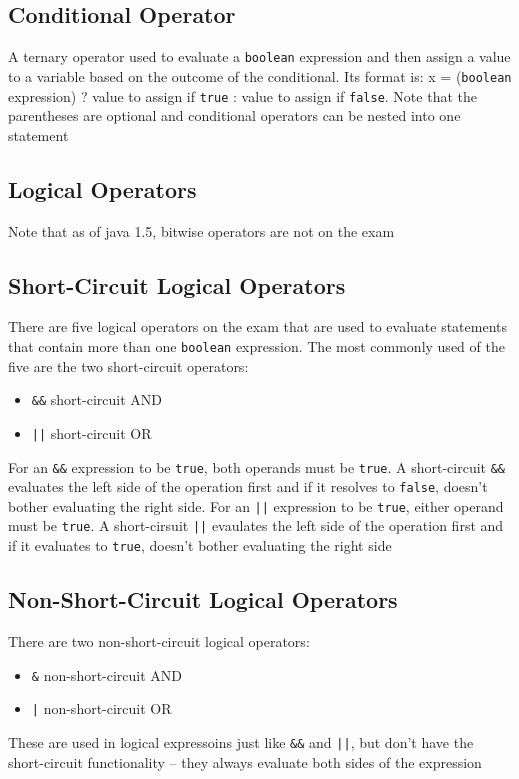 \subsection{Conditional Operator}
A ternary operator used to evaluate a \verb#boolean# expression and then assign 
a value to a variable based on the outcome of the conditional. Its format is: x 
= (\verb#boolean# expression) ? value to assign if \verb#true# : value to 
assign if \verb#false#. Note that the parentheses are optional and conditional 
operators can be nested into one statement

\subsection{Logical Operators}
Note that as of java 1.5, bitwise operators are not on the exam

\subsection{Short-Circuit Logical Operators}
There are five logical operators on the exam that are used to evaluate 
statements that contain more than one \verb#boolean# expression. The most 
commonly used of the five are the two short-circuit operators:
\begin{itemize}
    \item \verb#&&# short-circuit AND
    \item \verb#||# short-circuit OR
\end{itemize}
For an \verb#&&# expression to be \verb#true#, both operands must be 
\verb#true#. A short-circuit \verb#&&# evaluates the left side of the operation 
first and if it resolves to \verb#false#, doesn't bother evaluating the right 
side. For an \verb#||# expression to be \verb#true#, either operand must be 
\verb#true#. A short-cirsuit \verb#||# evaulates the left side of the operation 
first and if it evaluates to \verb#true#, doesn't bother evaluating the right 
side

\subsection{Non-Short-Circuit Logical Operators}
There are two non-short-circuit logical operators:
\begin{itemize}
    \item \verb#&# non-short-circuit AND
    \item \verb#|# non-short-circuit OR
\end{itemize}
These are used in logical expressoins just like \verb#&&# and \verb#||#, but 
don't have the short-circuit functionality -- they always evaluate both sides 
of the expression

